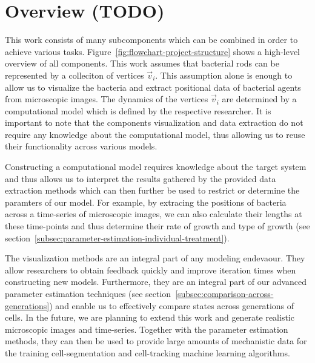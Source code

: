 \documentclass{article}
\begin{document}
\section{Overview (TODO)}
This work consists of many subcomponents which can be combined in order to achieve various tasks.
Figure~\ref{fig:flowchart-project-structure} shows a high-level overview of all components.
This work assumes that bacterial rods can be represented by a colleciton of vertices $\vec{v}_i$.
This assumption alone is enough to allow us to visualize the bacteria and extract positional data
of bacterial agents from microscopic images.
The dynamics of the vertices $\vec{v}_i$ are determined by a computational model which is defined
by the respective researcher.
It is important to note that the components visualization and data extraction do not require any
knowledge about the computational model, thus allowing us to reuse their functionality across
various models.

Constructing a computational model requires knowledge about the target system and thus allows us to
interpret the results gathered by the provided data extraction methods which can then further be
used to restrict or determine the paramters of our model.
For example, by extracing the positions of bacteria across a time-series of microscopic images, we
can also calculate their lengths at these time-points and thus determine their rate of growth and
type of growth (see section~\ref{subsec:parameter-estimation-individual-treatment}).

The visualization methods are an integral part of any modeling endevaour.
They allow researchers to obtain feedback quickly and improve iteration times when constructing new
models.
Furthermore, they are an integral part of our advanced parameter estimation techniques
(see section~\ref{subsec:comparison-across-generations}) and enable us to effectively compare states
across generations of cells.
In the future, we are planning to extend this work and generate realistic microscopic images and
time-series.
Together with the parameter estimation methods, they can then be used to provide large amounts of
mechanistic data for the training cell-segmentation and cell-tracking machine learning algorithms.
\end{document}
